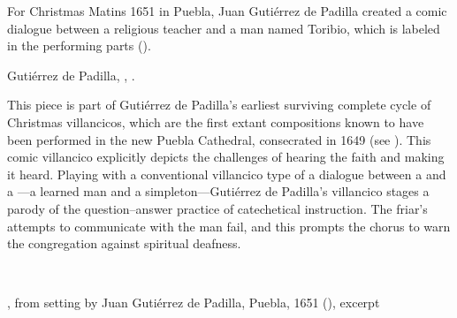 For Christmas Matins 1651 in Puebla, Juan Gutiérrez de Padilla created a comic
dialogue between a religious teacher and a  man named Toribio,
which is labeled  in the performing parts 
().%
\begin{Footnote}
    Gutiérrez de Padilla, ,
    .
\end{Footnote}
This piece is part of Gutiérrez de Padilla's earliest surviving complete cycle
of Christmas villancicos, which are the first extant compositions known to have
been performed in the new Puebla Cathedral, consecrated in 1649 (see
).
This comic  villancico explicitly depicts the challenges of
hearing the faith and making it heard.
Playing with a conventional villancico type of a dialogue between a
 and a ---a learned man and a
simpleton---Gutiérrez de Padilla's villancico stages a parody of the
question--answer practice of catechetical instruction.
The friar's attempts to communicate with the  man fail, and this
prompts the chorus to warn the congregation against spiritual deafness.


\begin{poemexample} \
    \caption{, from setting by Juan
    Gutiérrez de Padilla, Puebla, 1651 (\sig{MEX-Pc}{Leg. 1/2}), excerpt}
    \label{poem:Oyeme_Toribio-Padilla}
\end{poemexample}

